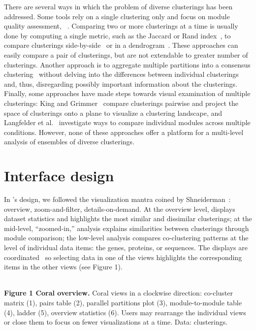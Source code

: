 \documentclass[12pt]{cmuthesis}
\begin{document}
  There are several ways in which the problem of diverse clusterings has been
  addressed. Some tools rely on a single clustering only and focus on module
  quality assessment, \eg~\cite{Yu2007a, Hibbs2005}. Comparing two or more
  clusterings at a time is usually done by computing a single metric, such as the
  Jaccard or Rand index~\cite{Thalamuthu2006}, to compare clusterings
  side-by-side~\cite{Seo2007a} or in a dendrogram~\cite{Laderas2007}. These
  approaches can easily compare a pair of clusterings, but are not extendable to
  greater number of clusterings. Another approach is to aggregate multiple
  partitions into a consensus clustering~\cite{strehl02, Monti2003a} without
  delving into the differences between individual clusterings and, thus,
  disregarding possibly important information about the clusterings. Finally, some
  approaches have made steps towards visual examination of multiple clusterings:
  King and Grimmer~\cite{Grimmer2011} compare clusterings pairwise and project the
  space of clusterings onto a plane to visualize a clustering landscape, and
  Langfelder et al.~\cite{Langfelder2011} investigate ways to compare individual
  modules across multiple conditions.{{\pagebreak}\break} However, none of these approaches offer a
  platform for a multi-level analysis of ensembles of diverse clusterings.

\section{Interface design}

  In \Coral's design, we followed the visualization mantra coined by
  Shneiderman~\cite{Shneiderman1996}: overview, zoom-and-filter,
  details-on-demand. At the overview level, \Coral displays dataset statistics and
  highlights the most similar and dissimilar clusterings; at the mid-level,
  ``zoomed-in,'' analysis explains similarities between clusterings through module
  comparison; the low-level analysis compares co-clustering patterns at the level
  of individual data items: the genes, proteins, or sequences. The displays are
  coordinated~\cite{North2000} so selecting data in one of the views highlights
  the corresponding items in the other views (see Figure 1).

  \hrulefill \\
  \textbf{Figure 1 Coral overview.}
  Coral views in a clockwise direction: co-cluster matrix (1), pairs table (2),
  parallel partitions plot (3), module-to-module table (4), ladder (5), overview
  statistics (6). Users may rearrange the individual views or close them to focus
  on fewer visualizations at a time. Data: \Athal clusterings.
  \\[-6pt]\hrulefill \\
\end{document}
